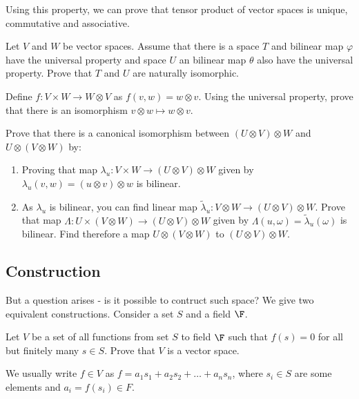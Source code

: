Using this property, we can prove that tensor product of vector spaces is unique, commutative and associative.

\begin{prob}
  Let $V$ and $W$ be vector spaces. Assume that there is a space $T$ and bilinear map $\varphi$ have the universal property and space $U$ an bilinear map $\theta$ also have
  the universal property. Prove that $T$ and $U$ are naturally isomorphic.
\end{prob}

\begin{prob}
  Define $f:V\times W\to W\otimes V$ as $f(v,w)=w\otimes v$. Using the universal property, prove that there is an isomorphism $v\otimes w\mapsto w \otimes v$.
\end{prob}

\begin{prob}
  Prove that there is a canonical isomorphism between $(U\otimes V)\otimes W$ and $U\otimes (V\otimes W)$ by:
  \begin{enumerate}
    \item Proving that map $\lambda_u : V\times W\to (U\otimes V)\otimes W$ given by $\lambda_u(v,w)=(u\otimes v)\otimes w$ is bilinear.
    \item As $\lambda_u$ is bilinear, you can find linear map $\tilde \lambda_u: V\otimes W\to (U\otimes V)\otimes W$. Prove that map
      $\Lambda : U\times (V\otimes W)\to (U\otimes V)\otimes W$ given by $\Lambda (u, \omega)=\tilde\lambda_u(\omega)$ is bilinear. Find therefore a map
      $U\otimes (V\otimes W)$ to $(U\otimes V)\otimes W$.
  \end{enumerate}
\end{prob}

\subsection{Construction}
But a question arises - is it possible to contruct such space? We give two equivalent constructions. Consider a set $S$ and a field $\F$.
\begin{prob}
  Let $V$ be a set of all functions from set $S$ to field $\F$ such that $f(s)=0$ for all but finitely many $s\in S$. Prove that $V$ is a vector space.
\end{prob}

We usually write $f\in V$ as $f=a_1s_1 + a_2s_2+\dots+a_ns_n$, where $s_i\in S$ are some elements and $a_i=f(s_i)\in F$.

